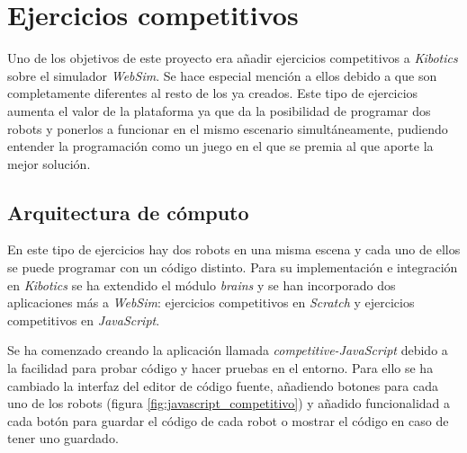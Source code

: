 \section{Ejercicios competitivos}
\label{sec:competitive}
Uno de los objetivos de este proyecto era añadir ejercicios competitivos a \textit{Kibotics} sobre el simulador \textit{WebSim}. Se hace especial mención a ellos debido a que son completamente diferentes al resto de los ya creados. Este tipo de ejercicios aumenta el valor de la plataforma ya que da la posibilidad de programar dos robots y ponerlos a funcionar en el mismo escenario simultáneamente, pudiendo entender la programación como un juego en el que se premia al que aporte la mejor solución.

\subsection{Arquitectura de cómputo}
\label{subsec:arquitectura}
En este tipo de ejercicios hay dos robots en una misma escena y cada uno de ellos se puede programar con un código distinto. Para su implementación e integración en \textit{Kibotics} se ha extendido el módulo \textit{brains} y se han incorporado dos aplicaciones más a \textit{WebSim}: ejercicios competitivos en \textit{Scratch} y ejercicios competitivos en \textit{JavaScript}. 

Se ha comenzado creando la aplicación llamada \textit{competitive-JavaScript} debido a la facilidad para probar código y hacer pruebas en el entorno. Para ello se ha cambiado la interfaz del editor de código fuente, añadiendo botones para cada uno de los robots (figura \ref{fig:javascript_competitivo}) y añadido funcionalidad a cada botón para guardar el código de cada robot o mostrar el código en caso de tener uno guardado. 

